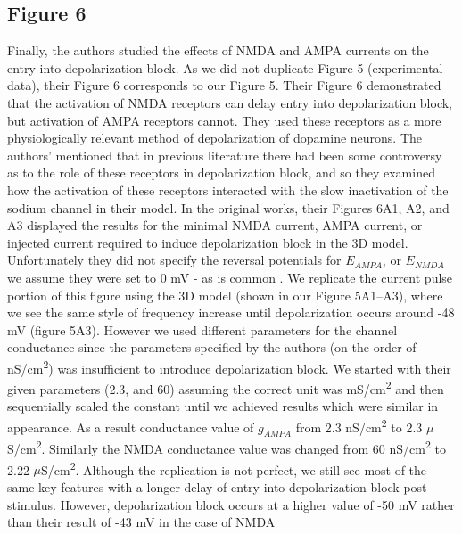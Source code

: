 \subsection{Figure 6}
Finally, the authors studied the effects of NMDA and AMPA currents on the entry into depolarization block. As we did not duplicate Figure 5 (experimental data), their Figure 6 corresponds to our Figure 5. Their Figure 6 demonstrated that the activation of NMDA receptors can delay entry into depolarization block, but activation of AMPA receptors cannot. They used these receptors as a more physiologically relevant method of depolarization of dopamine neurons. The authors’ mentioned that in previous literature there had been some controversy as to the role of these receptors in depolarization block, and so they examined how the activation of these receptors interacted with the slow inactivation of the sodium channel in their model. In the original works, their Figures 6A1, A2, and A3 displayed the results for the minimal NMDA current, AMPA current, or injected current required to induce depolarization block in the 3D model. Unfortunately they did not specify the reversal potentials for $E_{AMPA}$, or $E_{NMDA}$ we assume they were set to 0 mV - as is common \cite{neuroscience_2001}. We replicate the current pulse portion of this figure using the 3D model (shown in our Figure 5A1--A3), where we see the same style of frequency increase until depolarization occurs around -48 mV (figure 5A3). However we used different parameters for the channel conductance since the parameters specified by the authors (on the order of nS/cm\textsuperscript{2}) was insufficient to introduce depolarization block. We started with their given parameters (2.3, and 60) assuming the correct unit was mS/cm\textsuperscript{2} and then sequentially scaled the constant until we achieved results which were similar in appearance. As a result conductance value of $g_{AMPA}$ from 2.3 nS/cm\textsuperscript{2} to 2.3 $\mu$S/cm\textsuperscript{2}. Similarly the NMDA conductance value was changed from 60 nS/cm\textsuperscript{2} to 2.22 $\mu$S/cm\textsuperscript{2}. Although the replication is not perfect, we still see most of the same key features with a longer delay of entry into depolarization block post-stimulus. However, depolarization block occurs at a higher value of -50 mV rather than their result of -43 mV in the case of NMDA

